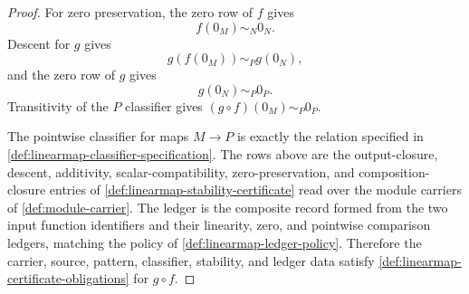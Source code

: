 \begin{proof}
For zero preservation, the zero row of $f$ gives
$$
f(0_M)\sim_N0_N.
$$
Descent for $g$ gives
$$
g(f(0_M))\sim_P g(0_N),
$$
and the zero row of $g$ gives
$$
g(0_N)\sim_P0_P.
$$
Transitivity of the $P$ classifier gives $(g\circ f)(0_M)\sim_P0_P$.

The pointwise classifier for maps $M\to P$ is exactly the relation specified in \autoref{def:linearmap-classifier-specification}. The rows above are the output-closure, descent, additivity, scalar-compatibility, zero-preservation, and composition-closure entries of \autoref{def:linearmap-stability-certificate} read over the module carriers of \autoref{def:module-carrier}. The ledger is the composite record formed from the two input function identifiers and their linearity, zero, and pointwise comparison ledgers, matching the policy of \autoref{def:linearmap-ledger-policy}. Therefore the carrier, source, pattern, classifier, stability, and ledger data satisfy \autoref{def:linearmap-certificate-obligations} for $g\circ f$.
\end{proof}

